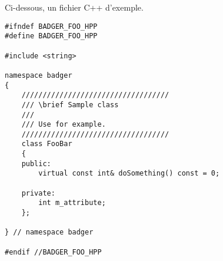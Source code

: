     Ci-dessous, un fichier C++ d'exemple.
\newline

    \begin{lstlisting}
#ifndef BADGER_FOO_HPP
#define BADGER_FOO_HPP

#include <string>

namespace badger
{
    ///////////////////////////////////
    /// \brief Sample class
    ///
    /// Use for example.
    ///////////////////////////////////
    class FooBar
    {
    public:
        virtual const int& doSomething() const = 0;

    private:
        int m_attribute;
    };

} // namespace badger

#endif //BADGER_FOO_HPP
    \end{lstlisting}




